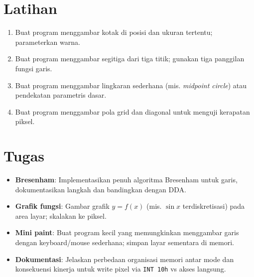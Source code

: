 \section{Latihan}
\begin{enumerate}
  \item Buat program menggambar kotak di posisi dan ukuran tertentu; parameterkan warna.
  \item Buat program menggambar segitiga dari tiga titik; gunakan tiga panggilan fungsi garis.
  \item Buat program menggambar lingkaran sederhana (mis. \textit{midpoint circle}) atau pendekatan parametris dasar.
  \item Buat program menggambar pola grid dan diagonal untuk menguji kerapatan piksel.
\end{enumerate}

\section{Tugas}
\begin{itemize}
  \item \textbf{Bresenham}: Implementasikan penuh algoritma Bresenham untuk garis, dokumentasikan langkah dan bandingkan dengan DDA.
  \item \textbf{Grafik fungsi}: Gambar grafik \(y=f(x)\) (mis. \(\sin x\) terdiskretisasi) pada area layar; skalakan ke piksel.
  \item \textbf{Mini paint}: Buat program kecil yang memungkinkan menggambar garis dengan keyboard/mouse sederhana; simpan layar sementara di memori.
  \item \textbf{Dokumentasi}: Jelaskan perbedaan organisasi memori antar mode dan konsekuensi kinerja untuk write pixel via \texttt{INT 10h} vs akses langsung.
\end{itemize}

